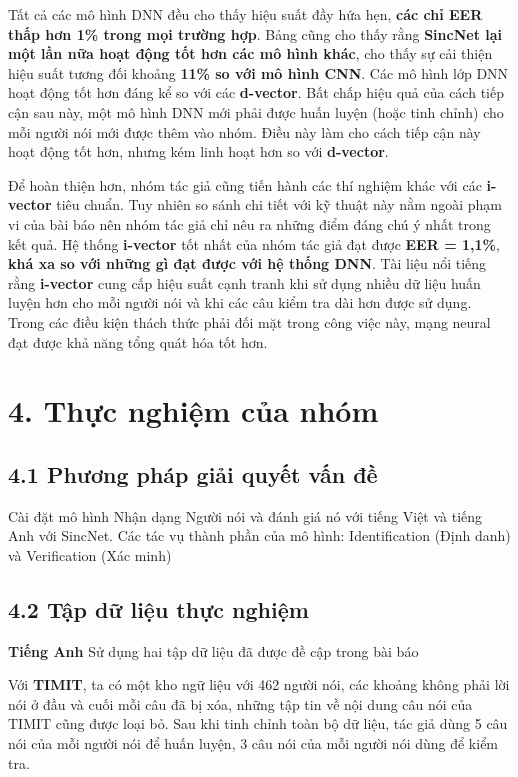 \documentclass{article}
\begin{document}
	Tất cả các mô hình DNN đều cho thấy hiệu suất đầy hứa hẹn, \textbf{các chỉ EER thấp hơn 1\% trong mọi trường hợp}. Bảng cũng cho thấy rằng \textbf{SincNet lại một lần nữa hoạt động tốt hơn các mô hình khác}, cho thấy sự cải thiện hiệu suất tương đối khoảng \textbf{11\% so với mô hình CNN}. Các mô hình lớp DNN hoạt động tốt hơn đáng kể so với các \textbf{d-vector}. Bất chấp hiệu quả của cách tiếp cận sau này, một mô hình DNN mới phải được huấn luyện (hoặc tinh chỉnh) cho mỗi người nói mới được thêm vào nhóm. Điều này làm cho cách tiếp cận này hoạt động tốt hơn, nhưng kém linh hoạt hơn so với \textbf{d-vector}.
	
	Để hoàn thiện hơn, nhóm tác giả cũng tiến hành các thí nghiệm khác với các \textbf{i-vector} tiêu chuẩn. Tuy nhiên so sánh chi tiết với kỹ thuật này nằm ngoài phạm vi của bài báo nên nhóm tác giả chỉ nêu ra những điểm đáng chú ý nhất trong kết quả. Hệ thống \textbf{i-vector} tốt nhất của nhóm tác giả đạt được \textbf{EER = 1,1\%}, \textbf{khá xa so với những gì đạt được với hệ thống DNN}. Tài liệu nổi tiếng rằng \textbf{i-vector} cung cấp hiệu suất cạnh tranh khi sử dụng nhiều dữ liệu huấn luyện hơn cho mỗi người nói và khi các câu kiểm tra dài hơn được sử dụng. Trong các điều kiện thách thức phải đối mặt trong công việc này, mạng neural đạt được khả năng tổng quát hóa tốt hơn.

	\section{4. Thực nghiệm của nhóm}
	\subsection{4.1 Phương pháp giải quyết vấn đề}
	Cài đặt mô hình Nhận dạng Người nói và đánh giá nó với tiếng Việt và tiếng Anh với SincNet.
	Các tác vụ thành phần của mô hình: Identification (Định danh) và Verification (Xác minh)
	
	\subsection{4.2 Tập dữ liệu thực nghiệm}
	\qquad \textbf{Tiếng Anh} Sử dụng hai tập dữ liệu đã được đề cập trong bài báo

	Với \textbf{TIMIT}, ta có một kho ngữ liệu với 462 người nói, các khoảng không phải lời nói ở đầu và cuối mỗi câu đã bị xóa, những tập tin về nội dung câu nói của TIMIT cũng được loại bỏ. Sau khi tinh chỉnh toàn bộ dữ liệu, tác giả dùng 5 câu nói của mỗi người nói để huấn luyện, 3 câu nói của mỗi người nói dùng để kiểm tra.
	
\end{document}
